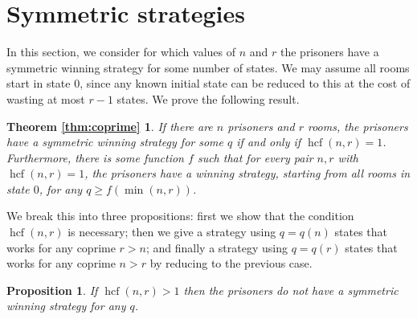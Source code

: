 \documentclass[a4paper,11pt]{extarticle}
\newtheorem{proposition}[theorem]{Proposition}
\newtheorem*{thmtwo}{Theorem \ref{thm:coprime}}
\theoremstyle{definition}
\theoremstyle{remark}
\newcommand{\hcf}{\operatorname{hcf}}
\begin{document}
	\section{Symmetric strategies}\label{sec:symm}
	In this section, we consider for which values of $n$ and $r$ the prisoners have a symmetric winning strategy for some number of states. We may assume all rooms start in state $0$, since any known initial state can be reduced to this at the cost of wasting at most $r-1$ states. We prove the following result.
	\begin{thmtwo}
		If there are $n$ prisoners and $r$ rooms, the prisoners have a symmetric winning strategy for some $q$ if and only if $\hcf(n,r)=1$. Furthermore, there is some function $f$ such that for every pair $n,r$ with $\hcf(n,r)=1$, the prisoners have a winning strategy, starting from all rooms in state $0$, for any $q\geq f(\min(n,r))$.
	\end{thmtwo}
	We break this into three propositions: first we show that the condition $\hcf(n,r)$ is necessary; then we give a strategy using $q=q(n)$ states that works for any coprime $r>n$; and finally a strategy using $q=q(r)$ states that works for any coprime $n>r$ by reducing to the previous case. 
	\begin{proposition}\label{not-coprime}If $\hcf(n,r)>1$ then the prisoners do not have a symmetric winning strategy for any $q$.\end{proposition}
\end{document}
